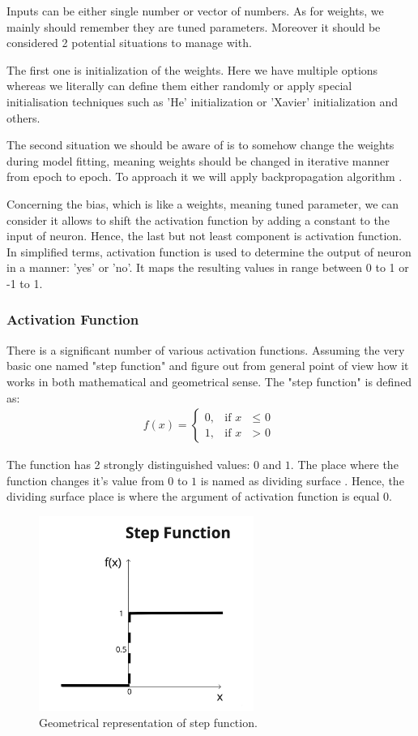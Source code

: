 Inputs can be either single number or vector of numbers. As for weights, we mainly should remember they are tuned parameters. Moreover it should be considered 2 potential situations to manage with. 

The first one is initialization of the weights. Here we have multiple options whereas we literally can define them either randomly or apply special initialisation techniques such as 'He' initialization or 'Xavier' initialization and others. 

The second situation we should be aware of is to somehow change the weights during model fitting, meaning weights should be changed in iterative manner from epoch to epoch. To approach it we will apply backpropagation algorithm \cite{Benvenuto1992}. 

Concerning the bias, which is like a weights, meaning tuned parameter, we can consider it allows to shift the activation function by adding a constant to the input of neuron. Hence, the last but not least component is activation function. In simplified terms, activation function is used to determine the output of neuron in a manner: 'yes' or 'no'. It maps the resulting values in range between 0 to 1 or -1 to 1.            

\subsubsection{Activation Function}
There is a significant number of various activation functions. Assuming the very basic one named "step function" and figure out from general point of view how it works in both mathematical and geometrical sense.   
The "step function" is defined as:
\begin{align*}
f(x) = \begin{cases} 0, & \mbox{if } x\mbox{ $\leq$ 0} \\ 1, & \mbox{if } x\mbox{ $>$ 0} \end{cases}
\end{align*}

The function has 2 strongly distinguished values: $0$ and $1$. The place where the function changes it's value from $0$ to $1$ is named as dividing surface \cite{Apicella2021}. Hence, the dividing surface place is where the argument of activation function is equal $0$.

\begin{figure}[h]
    \centering \includegraphics[width=7cm]{images/step_function.jpeg}
    \caption {Geometrical representation of step function.}
\end{figure}

